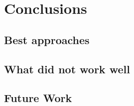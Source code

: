 \chapter{Conclusions}
\label{chap:conclusions}




\section{Best approaches}



\section{What did not work well}



\section{Future Work}





